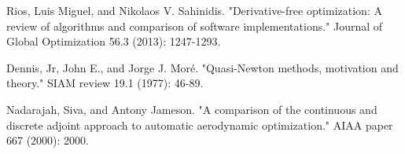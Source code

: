 \documentclass[a4paper,onecolumn]{article}
\theoremstyle{remark}
\begin{document}
\begin{thebibliography}{9}
%
%
%
%
%
%
%

%
Rios, Luis Miguel, and Nikolaos V. Sahinidis. 
"Derivative-free optimization: A review of algorithms and comparison of software implementations." 
Journal of Global Optimization 56.3 (2013): 1247-1293.


%
Dennis, Jr, John E., and Jorge J. Moré. 
"Quasi-Newton methods, motivation and theory." 
SIAM review 19.1 (1977): 46-89.


%
Nadarajah, Siva, and Antony Jameson. 
"A comparison of the continuous and discrete adjoint approach to automatic aerodynamic optimization." 
AIAA paper 667 (2000): 2000.


\end{thebibliography}
\end{document}
